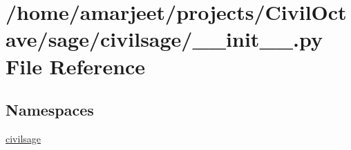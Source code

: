 \hypertarget{a00010}{}\section{/home/amarjeet/projects/\+Civil\+Octave/sage/civilsage/\+\_\+\+\_\+init\+\_\+\+\_\+.py File Reference}
\label{a00010}
\subsection*{Namespaces}
\begin{DoxyCompactItemize}
\item 
 \hyperlink{a00031}{civilsage}
\end{DoxyCompactItemize}
